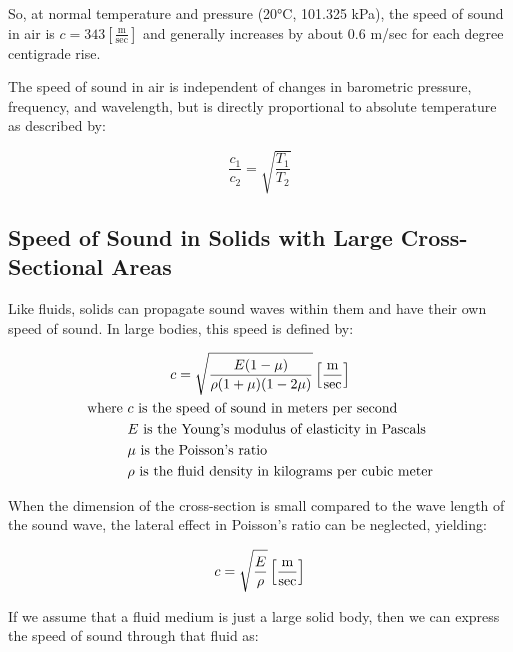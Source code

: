 So, at normal temperature and pressure (20°C, 101.325 kPa), the speed of sound in air is $c=343 \left[\frac{\text{m}}{\text{sec}}\right] $ and generally increases by about 0.6 m/sec for each degree centigrade rise.

The speed of sound in air is independent of changes in barometric pressure, frequency, and wavelength, but is directly proportional to absolute temperature as described by:

\begin{equation}
    \frac{c_1}{c_2} = \sqrt{\frac{T_1}{T_2}}
\end{equation}

    \subsection{Speed of Sound in Solids with Large Cross-Sectional Areas}
    Like fluids, solids can propagate sound waves within them and have their own speed of sound.
    In large bodies, this speed is defined by:

    \begin{gather} \labeq{speed_of_sound_solids}
        c = \sqrt{\frac{E(1-\mu)}{\rho(1+\mu)(1-2\mu)}} \left[\frac{\text{m}}{\text{sec}}\right] \\    
        \begin{aligned}
            \text{where }   &c \text{ is the speed of sound in meters per second} \\
                            &E \text{ is the Young's modulus of elasticity in Pascals} \\
                            &\mu \text{ is the Poisson's ratio} \\
                            &\rho \text{ is the fluid density in kilograms per cubic meter} \\
        \end{aligned} \notag
    \end{gather}

    When the dimension of the cross-section is small compared to the wave length of the sound wave, the lateral effect in Poisson's ratio can be neglected, yielding:

    \begin{equation} \labeq{speed_of_sound_solid_simple}
        c = \sqrt{\frac{E}{\rho}} \left[\frac{\text{m}}{\text{sec}}\right]
    \end{equation}

If we assume that a fluid medium is just a large solid body, then we can express the speed of sound through that fluid as:

